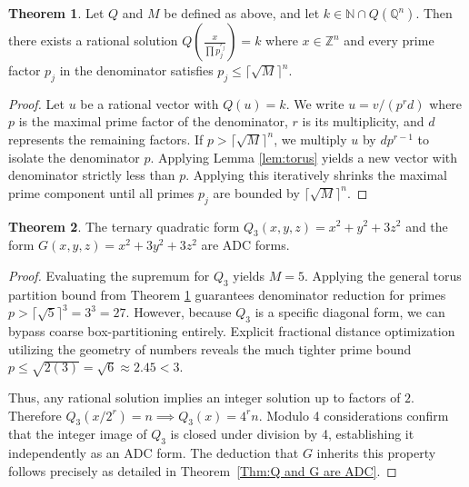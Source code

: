 \documentclass[11pt,letterpaper]{amsart} %
\theoremstyle{definition}
\newtheorem{apptheorem}{Theorem}[section]
\begin{document}
\begin{apptheorem}
\label{thm:general_adc}
Let $Q$ and $M$ be defined as above, and let $k \in \mathbb{N} \cap Q(\mathbb{Q}^n)$. Then there exists a rational solution $Q\left(\frac{x}{\prod p_j^{r_j}}\right) = k$ where $x \in \mathbb{Z}^n$ and every prime factor $p_j$ in the denominator satisfies $p_j \le \lceil \sqrt{M} \rceil^n$.
\end{apptheorem}

\begin{proof}
Let $u$ be a rational vector with $Q(u) = k$. We write $u = v/(p^r d)$ where $p$ is the maximal prime factor of the denominator, $r$ is its multiplicity, and $d$ represents the remaining factors. If $p > \lceil \sqrt{M} \rceil^n$, we multiply $u$ by $dp^{r-1}$ to isolate the denominator $p$. Applying Lemma \ref{lem:torus} yields a new vector with denominator strictly less than $p$. Applying this iteratively shrinks the maximal prime component until all primes $p_j$ are bounded by $\lceil \sqrt{M} \rceil^n$.
\end{proof}

\begin{apptheorem}
The ternary quadratic form $Q_3(x,y,z) = x^2+y^2+3z^2$ and the form $G(x,y,z) = x^2+3y^2+3z^2$ are ADC forms.
\end{apptheorem}

\begin{proof}
Evaluating the supremum for $Q_3$ yields $M = 5$. Applying the general torus partition bound from Theorem \ref{thm:general_adc} guarantees denominator reduction for primes $p > \lceil \sqrt{5} \rceil^3 = 3^3 = 27$. However, because $Q_3$ is a specific diagonal form, we can bypass coarse box-partitioning entirely. Explicit fractional distance optimization utilizing the geometry of numbers reveals the much tighter prime bound $p \le \sqrt{2(3)} = \sqrt{6} \approx 2.45 < 3$. 

Thus, any rational solution implies an integer solution up to factors of $2$. Therefore $Q_3(x/2^r) = n \implies Q_3(x) = 4^rn$. Modulo 4 considerations confirm that the integer image of $Q_3$ is closed under division by 4, establishing it independently as an ADC form. The deduction that $G$ inherits this property follows precisely as detailed in Theorem~\ref{Thm:Q and G are ADC}.
\end{proof}
\end{document}
